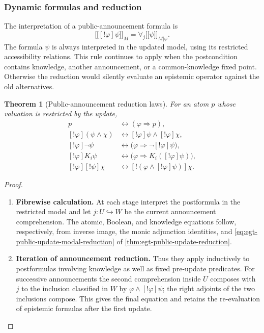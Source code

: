 \documentclass[11pt,a4paper]{article}
\numberwithin{equation}{section}
\newtheorem{theorem}{Theorem}[section]
\theoremstyle{definition}
\theoremstyle{remark}
\theoremstyle{plain}
\providecommand{\llbracket}{\mathopen{[\![}}
\providecommand{\rrbracket}{\mathclose{]\!]}}
\providecommand{\sem}[1]{\llbracket #1\rrbracket}
\begin{document}
\subsubsection{Dynamic formulas and reduction}

The interpretation of a public-announcement formula is
\begin{equation}
 \sem{[!\varphi]\psi}_M
 =\forall_j\sem{\psi}_{M|\varphi}.
 \label{agt-eq-public-semantics}
\end{equation}
The formula $\psi$ is always interpreted in the updated model,
using its restricted accessibility relations. This rule continues to
apply when the postcondition contains knowledge, another announcement,
or a common-knowledge fixed point. Otherwise the reduction would
silently evaluate an epistemic operator against the old alternatives.

\begin{theorem}[Public-announcement reduction laws]
\label{agt-thm-public-reduction}
For an atom $p$ whose valuation is restricted by the update,
\begin{align*}
 [!\varphi]p&\leftrightarrow(\varphi\Rightarrow p),\\
 [!\varphi](\psi\wedge\chi)
 &\leftrightarrow[!\varphi]\psi\wedge[!\varphi]\chi,\\
 [!\varphi]\neg\psi
 &\leftrightarrow\bigl(\varphi\Rightarrow\neg[!\varphi]\psi\bigr),\\
 [!\varphi]K_i\psi
 &\leftrightarrow\bigl(\varphi\Rightarrow K_i([!\varphi]\psi)\bigr),\\
 [!\varphi][!\psi]\chi
 &\leftrightarrow[!(\varphi\wedge[!\varphi]\psi)]\chi.
\end{align*}
\end{theorem}
\begin{proof}
\leavevmode
\begin{enumerate}[label=\textup{(\arabic*)},leftmargin=*,itemsep=4pt,topsep=3pt]
  \item \textbf{Fibrewise calculation.} At each stage interpret the postformula in the restricted model and
let $j:U\hookrightarrow W$ be the current announcement comprehension. The atomic, Boolean, and knowledge equations follow, respectively,
from inverse image, the monic adjunction identities, and
\eqref{eq:egt-public-update-modal-reduction} of
\cref{thm:egt-public-update-reduction}.
  \item \textbf{Iteration of announcement reduction.} Thus they apply inductively to
postformulas involving knowledge as well as fixed pre-update
predicates. For successive announcements the second comprehension
inside $U$ composes with $j$ to the inclusion classified in $W$ by
$\varphi\wedge[!\varphi]\psi$; the right adjoints of the two
inclusions compose. This gives the final equation and retains the
re-evaluation of epistemic formulas after the first update.
\end{enumerate}
\end{proof}
\end{document}
